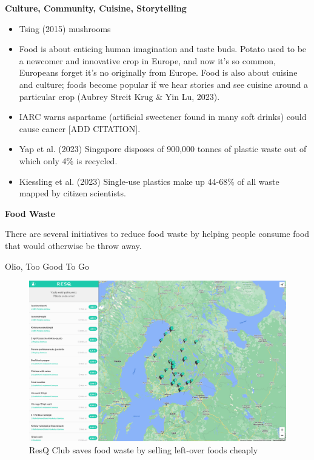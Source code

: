 \documentclass[
  letterpaper,
  DIV=11,
  numbers=noendperiod]{scrartcl}
\providecommand{\tightlist}{%
  \setlength{\itemsep}{0pt}\setlength{\parskip}{0pt}}\usepackage{longtable,booktabs,array}
\begin{document}
\textbf{Culture, Community, Cuisine, Storytelling}

\begin{itemize}
\tightlist
\item
  Tsing (2015) mushrooms
\item
  Food is about enticing human imagination and taste buds. Potato used
  to be a newcomer and innovative crop in Europe, and now it's so
  common, Europeans forget it's no originally from Europe. Food is also
  about cuisine and culture; foods become popular if we hear stories and
  see cuisine around a particular crop (Aubrey Streit Krug \& Yin Lu,
  2023).
\item
  IARC warns aspartame (artificial sweetener found in many soft drinks)
  could cause cancer {[}ADD CITATION{]}.
\item
  Yap et al. (2023) Singapore disposes of 900,000 tonnes of plastic
  waste out of which only 4\% is recycled.
\item
  Kiessling et al. (2023) Single-use plastics make up 44-68\% of all
  waste mapped by citizen scientists.
\end{itemize}

\textbf{Food Waste}

There are several initiatives to reduce food waste by helping people
consume food that would otherwise be throw away.

Olio, Too Good To Go

\begin{figure}[H]

{\centering \includegraphics[width=1\linewidth,height=\textheight,keepaspectratio]{./images/design/resq-club.png}

}

\caption{ResQ Club saves food waste by selling left-over foods cheaply}

\end{figure}%
\end{document}
